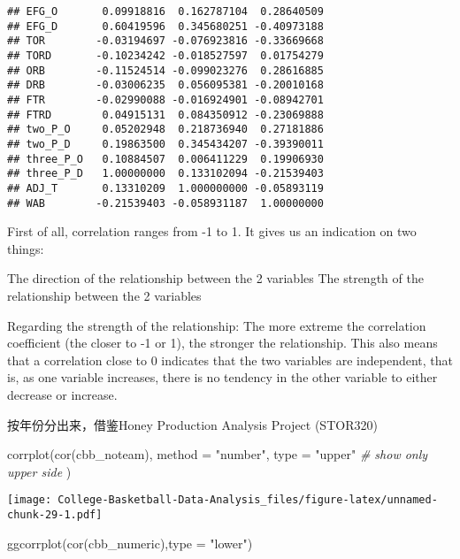 \documentclass[
]{article}
\newenvironment{Shaded}{\begin{snugshade}}{\end{snugshade}}
\newcommand{\AttributeTok}[1]{\textcolor[rgb]{0.77,0.63,0.00}{#1}}
\newcommand{\CommentTok}[1]{\textcolor[rgb]{0.56,0.35,0.01}{\textit{#1}}}
\newcommand{\FunctionTok}[1]{\textcolor[rgb]{0.00,0.00,0.00}{#1}}
\newcommand{\NormalTok}[1]{#1}
\newcommand{\StringTok}[1]{\textcolor[rgb]{0.31,0.60,0.02}{#1}}
\begin{document}
\begin{verbatim}
## EFG_O       0.09918816  0.162787104  0.28640509
## EFG_D       0.60419596  0.345680251 -0.40973188
## TOR        -0.03194697 -0.076923816 -0.33669668
## TORD       -0.10234242 -0.018527597  0.01754279
## ORB        -0.11524514 -0.099023276  0.28616885
## DRB        -0.03006235  0.056095381 -0.20010168
## FTR        -0.02990088 -0.016924901 -0.08942701
## FTRD        0.04915131  0.084350912 -0.23069888
## two_P_O     0.05202948  0.218736940  0.27181886
## two_P_D     0.19863500  0.345434207 -0.39390011
## three_P_O   0.10884507  0.006411229  0.19906930
## three_P_D   1.00000000  0.133102094 -0.21539403
## ADJ_T       0.13310209  1.000000000 -0.05893119
## WAB        -0.21539403 -0.058931187  1.00000000
\end{verbatim}

First of all, correlation ranges from -1 to 1. It gives us an indication
on two things:

The direction of the relationship between the 2 variables The strength
of the relationship between the 2 variables

Regarding the strength of the relationship: The more extreme the
correlation coefficient (the closer to -1 or 1), the stronger the
relationship. This also means that a correlation close to 0 indicates
that the two variables are independent, that is, as one variable
increases, there is no tendency in the other variable to either decrease
or increase.

按年份分出来，借鉴Honey Production Analysis Project (STOR320)

\begin{Shaded}
\begin{Highlighting}[]
\FunctionTok{corrplot}\NormalTok{(}\FunctionTok{cor}\NormalTok{(cbb\_noteam),}
  \AttributeTok{method =} \StringTok{"number"}\NormalTok{,}
  \AttributeTok{type =} \StringTok{"upper"} \CommentTok{\# show only upper side}
\NormalTok{)}
\end{Highlighting}
\end{Shaded}

\texttt{[image: College-Basketball-Data-Analysis\_files/figure-latex/unnamed-chunk-29-1.pdf]}

\begin{Shaded}
\begin{Highlighting}[]
\FunctionTok{ggcorrplot}\NormalTok{(}\FunctionTok{cor}\NormalTok{(cbb\_numeric),}\AttributeTok{type =} \StringTok{"lower"}\NormalTok{)}
\end{Highlighting}
\end{Shaded}
\end{document}
